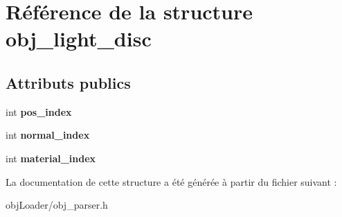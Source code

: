 \hypertarget{structobj__light__disc}{\section{Référence de la structure obj\-\_\-light\-\_\-disc}
\label{structobj__light__disc}
}
\subsection*{Attributs publics}
\begin{DoxyCompactItemize}
\item 
\hypertarget{structobj__light__disc_a06e88be817f6fc3b1ad8338a05d004db}{int {\bfseries pos\-\_\-index}}\label{structobj__light__disc_a06e88be817f6fc3b1ad8338a05d004db}

\item 
\hypertarget{structobj__light__disc_abff6571d08e00cab1cf246b460487076}{int {\bfseries normal\-\_\-index}}\label{structobj__light__disc_abff6571d08e00cab1cf246b460487076}

\item 
\hypertarget{structobj__light__disc_ab3f2c2e21bdda9da7efb82e9fb250cb0}{int {\bfseries material\-\_\-index}}\label{structobj__light__disc_ab3f2c2e21bdda9da7efb82e9fb250cb0}

\end{DoxyCompactItemize}


La documentation de cette structure a été générée à partir du fichier suivant \-:\begin{DoxyCompactItemize}
\item 
obj\-Loader/obj\-\_\-parser.\-h\end{DoxyCompactItemize}
